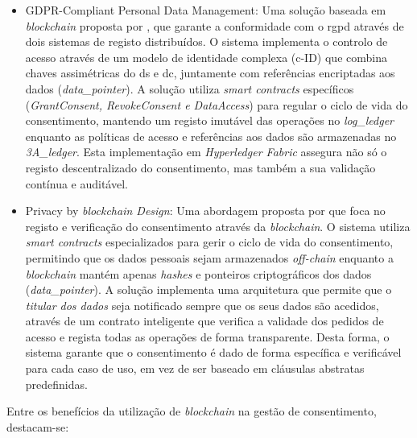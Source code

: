 \begin{itemize}
    \item GDPR-Compliant Personal Data Management: Uma solução baseada em \textit{blockchain} proposta por \citep{nguyen2020gdpr}, que garante a conformidade com o \acrshort{rgpd} através de dois sistemas de registo distribuídos. O sistema implementa o controlo de acesso através de um modelo de identidade complexa (c-ID) que combina chaves assimétricas do \acrshort{ds} e \acrshort{dc}, juntamente com referências encriptadas aos dados (\textit{data\_pointer}). A solução utiliza \textit{smart contracts} específicos (\textit{GrantConsent, RevokeConsent e DataAccess}) para regular o ciclo de vida do consentimento, mantendo um registo imutável das operações no \textit{log\_ledger} enquanto as políticas de acesso e referências aos dados são armazenadas no \textit{3A\_ledger}. Esta implementação em \textit{Hyperledger Fabric} assegura não só o registo descentralizado do consentimento, mas também a sua validação contínua e auditável.

    \item Privacy by \textit{blockchain Design}: Uma abordagem proposta por \citep{wirth2018privacy} que foca no registo e verificação do consentimento através da \textit{blockchain}. O sistema utiliza \textit{smart contracts} especializados para gerir o ciclo de vida do consentimento, permitindo que os dados pessoais sejam armazenados \textit{off-chain} enquanto a \textit{blockchain} mantém apenas \textit{hashes} e ponteiros criptográficos dos dados (\textit{data\_pointer}). A solução implementa uma arquitetura que permite que o \textit{titular dos dados} seja notificado sempre que os seus dados são acedidos, através de um contrato inteligente que verifica a validade dos pedidos de acesso e regista todas as operações de forma transparente. Desta forma, o sistema garante que o consentimento é dado de forma específica e verificável para cada caso de uso, em vez de ser baseado em cláusulas abstratas predefinidas.
\end{itemize}

Entre os benefícios da utilização de \textit{blockchain} na gestão de consentimento, destacam-se:

